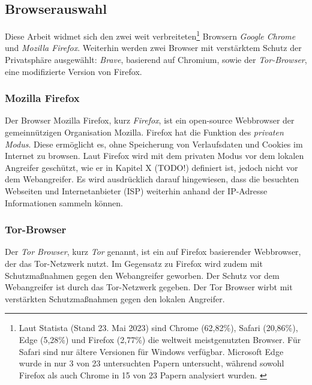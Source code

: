 \subsection{Browserauswahl}
\label{section:methodik-vorbereitung-browserauswahl}
Diese Arbeit widmet sich den zwei weit verbreiteten\footnote{Laut Statista \cite{Statista.23.05.2023}
(Stand 23. Mai 2023) sind Chrome (62,82\%), Safari (20,86\%), Edge (5,28\%) und Firefox (2,77\%) die weltweit meistgenutzten Browser. Für Safari sind nur ältere Versionen für Windows verfügbar. Microsoft Edge wurde in nur 3 von 23 untersuchten Papern untersucht, während sowohl Firefox als auch Chrome in 15 von 23 Papern analysiert wurden. \cite{Fayyad.2021, Horsman.2019, Gabet.2018, Aggarwal.2010, Oh.2011, Said.2011, Ohana.2013, Satvat.2014, Montasari.2015, Nalawade.2016, Rochmadi.2017, Md.2018, Muir.2019, Mahlous.2020, Izzati.2022}} Browsern \textit{Google Chrome} und \textit{Mozilla Firefox}.
Weiterhin werden zwei Browser mit verstärktem Schutz der Privatsphäre ausgewählt: \textit{Brave}, basierend auf Chromium, sowie der \textit{Tor-Browser}, eine modifizierte Version von Firefox.

\subsubsection*{Mozilla Firefox}
\label{subsubsection:methodik-vorbereitung-browserauswahl-firefox}
Der Browser Mozilla Firefox, kurz \textit{Firefox}, ist ein open-source Webbrowser der gemeinnützigen Organisation Mozilla. 
Firefox hat die Funktion des \textit{privaten Modus}. Diese ermöglicht es, ohne Speicherung von Verlaufsdaten und Cookies im Internet zu browsen.
Laut Firefox wird mit dem privaten Modus vor dem lokalen Angreifer geschützt, wie er in Kapitel X (TODO!) definiert ist, jedoch nicht vor dem Webangreifer.
Es wird ausdrücklich darauf hingewiesen, dass die besuchten Webseiten und Internetanbieter (ISP) weiterhin anhand der IP-Adresse Informationen sammeln können. \cite{Mozilla.05.06.2023}

\subsubsection*{Tor-Browser}
\label{subsubsection:methodik-vorbereitung-browserauswahl-tor}
Der \textit{Tor Browser}, kurz \textit{Tor} genannt, ist ein auf Firefox basierender Webbrowser, der das Tor-Netzwerk nutzt.
Im Gegensatz zu Firefox wird zudem mit Schutzmaßnahmen gegen den Webangreifer geworben.
Der Schutz vor dem Webangreifer ist durch das Tor-Netzwerk gegeben.
Der Tor Browser wirbt mit verstärkten Schutzmaßnahmen gegen den lokalen Angreifer. \cite{Tor.24.05.2023}

